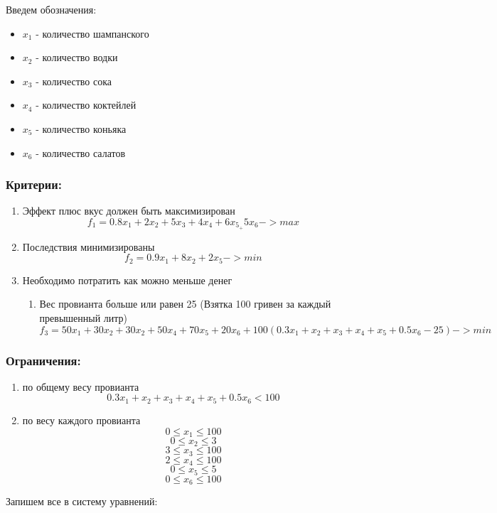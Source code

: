 \documentclass[14pt,a4paper,report]{report}
\begin{document}
Введем обозначения:
\begin{itemize}
    \item $x_1$ - количество шампанского 
    \item $x_2$ - количество водки
    \item $x_3$ - количество сока
    \item $x_4$ - количество коктейлей
    \item $x_5$ - количество коньяка
    \item $x_6$ - количество салатов
\end{itemize}

\subsubsection{Критерии:}

\begin{enumerate}
\item Эффект плюс вкус должен быть максимизирован $$ f_1 = 0.8x_1+2x_2+5x_3+4x_4+6x_5_+5x_6 -> max$$
\item Последствия минимизированы $$ f_2 = 0.9x_1+8x_2+2x_5 -> min$$
\item Необходимо потратить как можно меньше денег
\begin{enumerate}Вес провианта меньше  25 $$ f_3 = 50x_1+30x_2+30x_2+50x_4+70x_5+20x_6 -> min$$
\item Вес провианта больше или равен 25 (Взятка 100 гривен за каждый превышенный литр) $$ f_3 = 50x_1+30x_2+30x_2+50x_4+70x_5+20x_6 + 100(0.3x_1+x_2+x_3+x_4+x_5+0.5x_6-25) ->min$$
\end{enumerate}
\end{enumerate}

\subsubsection{Ограничения:}

\begin{enumerate}
    \item по общему весу провианта $$ 0.3x_1+x_2+x_3+x_4+x_5+0.5x_6 < 100 $$
    \item по весу каждого провианта 
    $$ 0 \leq x_1 \leq 100   $$
        $$ 0 \leq x_2 \leq 3   $$
    $$ 3 \leq x_3 \leq 100   $$
    $$ 2 \leq x_4 \leq 100   $$
    $$ 0 \leq x_5 \leq 5   $$
    $$ 0 \leq x_6 \leq 100   $$
    
\end{enumerate}


Запишем все в систему уравнений:
\end{document}
